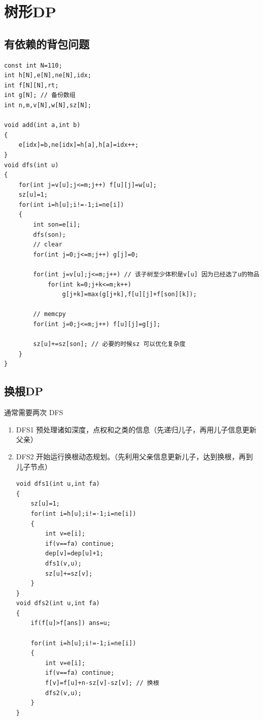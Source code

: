 \section{树形DP}
\subsection{有依赖的背包问题}

\begin{verbatim}
const int N=110;
int h[N],e[N],ne[N],idx;
int f[N][N],rt;
int g[N]; // 备份数组
int n,m,v[N],w[N],sz[N];

void add(int a,int b)
{
    e[idx]=b,ne[idx]=h[a],h[a]=idx++;
}
void dfs(int u)
{
    for(int j=v[u];j<=m;j++) f[u][j]=w[u];
    sz[u]=1;
    for(int i=h[u];i!=-1;i=ne[i])
    {
        int son=e[i];
        dfs(son);
        // clear
        for(int j=0;j<=m;j++) g[j]=0;

        for(int j=v[u];j<=m;j++) // 该子树至少体积是v[u] 因为已经选了u的物品
            for(int k=0;j+k<=m;k++)
                g[j+k]=max(g[j+k],f[u][j]+f[son][k]);

        // memcpy
        for(int j=0;j<=m;j++) f[u][j]=g[j];

        sz[u]+=sz[son]; // 必要的时候sz 可以优化复杂度 
    }
}
\end{verbatim}

\subsection{换根DP}

\par \noindent 通常需要两次 DFS
\begin{enumerate}
\item DFS1 预处理诸如深度，点权和之类的信息（先递归儿子，再用儿子信息更新父亲）

\item DFS2 开始运行换根动态规划。（先利用父亲信息更新儿子，达到换根，再到儿子节点）

\begin{verbatim}
void dfs1(int u,int fa)
{
    sz[u]=1;
    for(int i=h[u];i!=-1;i=ne[i])
    {
        int v=e[i];
        if(v==fa) continue;
        dep[v]=dep[u]+1;
        dfs1(v,u);
        sz[u]+=sz[v];
    }
}
void dfs2(int u,int fa)
{
    if(f[u]>f[ans]) ans=u;

    for(int i=h[u];i!=-1;i=ne[i])
    {
        int v=e[i];
        if(v==fa) continue;
        f[v]=f[u]+n-sz[v]-sz[v]; // 换根
        dfs2(v,u);
    }
}
\end{verbatim}
\end{enumerate}